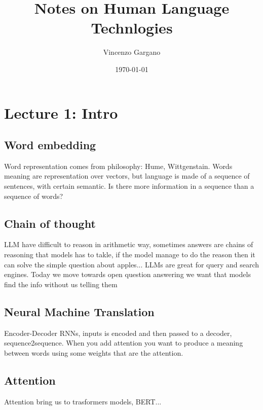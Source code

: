 \documentclass[12pt]{book}
\title{Notes on Human Language Technlogies}
\author{Vincenzo Gargano}
\begin{document}

\date{\today}

\maketitle

\tableofcontents
\clearpage

\chapter{Lecture 1: Intro}

\section{Word embedding}
Word representation comes from philosophy: Hume, Wittgenstain.\newline
Words meaning are representation over vectors, but language is made of a sequence of sentences, with certain semantic.
Is there more information in a sequence than a sequence of words?

\section{Chain of thought}
LLM have difficult to reason in arithmetic way, sometimes answers are chains of reasoning that models has to takle, if the model manage to do the reason then it can solve the simple question about apples...\newline
LLMs are great for query and search engines. Today we move towards open question answering we want that models find the info without us telling them

\section{Neural Machine Translation}
Encoder-Decoder RNNs, inputs is encoded and then passed to a decoder, sequence2sequence.
When you add attention you want to produce a meaning between words using some weights that are the attention.

\section{Attention}
Attention bring us to trasformers models, BERT...
\end{document}
